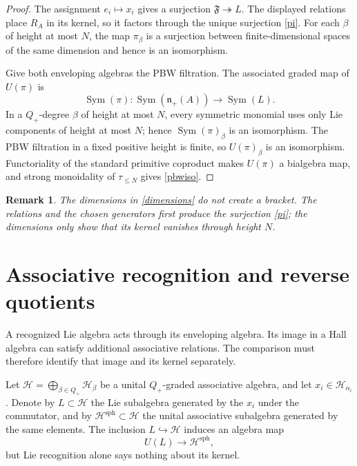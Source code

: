 \documentclass[11pt]{article}
\newtheorem{remark}[theorem]{Remark}
\begin{document}
\begin{proof}
The assignment $e_i\mapsto x_i$ gives a surjection
$\mathfrak F\twoheadrightarrow L$.  The displayed relations place $R_A$ in
its kernel, so it factors through the unique surjection \eqref{pi}.  For
each $\beta$ of height at most $N$, the map $\pi_\beta$ is a surjection
between finite-dimensional spaces of the same dimension and hence is an
isomorphism.

Give both enveloping algebras the PBW filtration.  The associated graded map
of $U(\pi)$ is
\[
 \operatorname{Sym}(\pi):
 \operatorname{Sym}(\mathfrak n_+(A))\longrightarrow
 \operatorname{Sym}(L).
\]
In a $Q_+$-degree $\beta$ of height at most $N$, every symmetric monomial
uses only Lie components of height at most $N$; hence
$\operatorname{Sym}(\pi)_\beta$ is an isomorphism.  The PBW filtration in a
fixed positive height is finite, so $U(\pi)_\beta$ is an isomorphism.
Functoriality of the standard primitive coproduct makes $U(\pi)$ a
bialgebra map, and strong monoidality of $\tau_{\leq N}$ gives
\eqref{pbwiso}.
\end{proof}

\begin{remark}
The dimensions in \eqref{dimensions} do not create a bracket.  The
relations and the chosen generators first produce the surjection \eqref{pi};
the dimensions only show that its kernel vanishes through height $N$.
\end{remark}

\section{Associative recognition and reverse quotients}
\label{sec:associative-comparison}

A recognized Lie algebra acts through its enveloping algebra.
Its image in a Hall algebra can satisfy additional associative
relations. The comparison must therefore identify that image and
its kernel separately.

Let $\mathcal H=\bigoplus_{\beta\in Q_+}\mathcal H_\beta$ be a unital
$Q_+$-graded associative algebra, and let
$x_i\in\mathcal H_{\alpha_i}$.  Denote by $L\subset\mathcal H$ the Lie
subalgebra generated by the $x_i$ under the commutator, and by
$\mathcal H^{\mathrm{sph}}\subset\mathcal H$ the unital associative
subalgebra generated by the same elements.  The inclusion
$L\hookrightarrow\mathcal H$ induces an algebra map
\[
 U(L)\longrightarrow\mathcal H^{\mathrm{sph}},
\]
but Lie recognition alone says nothing about its kernel.
\end{document}
